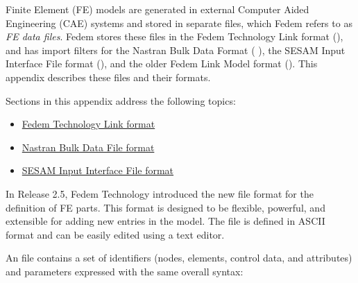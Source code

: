 %
%

%
%

\def\LinkFormatText#1{
  \medskip
  {\raggedright\tt#1}
  \medskip}


Finite Element (FE) models are generated in external
Computer Aided Engineering (CAE) systems and stored in separate files,
which Fedem refers to as {\sl FE data files}.
Fedem stores these files in the Fedem Technology Link format (), and
has import filters for the Nastran Bulk Data Format ( ),
the SESAM Input Interface File format (),
and the older Fedem Link Model format ().
This appendix describes these files and their formats.

Sections in this appendix address the following topics:

\begin{itemize}
\item
  \protect\hyperlink{fedem-technology-link-format}
                    {Fedem Technology Link format}
\item
  \protect\hyperlink{nastran-bulk-data-file-format}
                    {Nastran Bulk Data File format}
\item
  \protect\hyperlink{sesam-input-interface-file-format}
                    {SESAM Input Interface File format}
\end{itemize}

\clearpage



In Release 2.5, Fedem Technology introduced the new  file format
for the definition of FE parts. This format is designed to be flexible,
powerful, and extensible for adding new entries in the model. The file
is defined in ASCII format and can be easily edited using a text editor.



An  file contains a set of identifiers (nodes, elements, control
data, and attributes) and parameters expressed with the same overall syntax:

